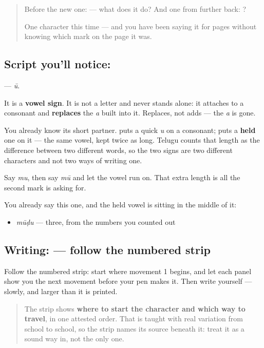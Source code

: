 \label{lesson:TE-S134-vowel-sign-uu}



\begin{quote}
Before the new one:  — what does it do? And one from further back: ?

One character this time — and you have been saying it for pages without knowing which mark on the page it was.
\end{quote}

\subsection*{Script you'll notice: }
\textbf{} — \emph{ū}.

It is a \textbf{vowel sign}. It is not a letter and never stands alone: it attaches to a consonant and \textbf{replaces} the \emph{a} built into it. Replaces, not adds — the \emph{a} is gone.

You already know its short partner. \textbf{} puts a quick \emph{u} on a consonant; \textbf{} puts a \textbf{held} one on it — the same vowel, kept twice as long. Telugu counts that length as the difference between two different words, so the two signs are two different characters and not two ways of writing one.

Say \emph{mu}, then say \emph{mū} and let the vowel run on. That extra length is all the second mark is asking for.

You already say this one, and the held vowel is sitting in the middle of it:

\begin{itemize}
\raggedright
  \item \textbf{} \emph{mūḍu} — three, from the numbers you counted out
\end{itemize}

\subsection*{Writing:  — follow the numbered strip}

Follow the numbered strip: start where movement 1 begins, and let each panel show you the next movement before your pen makes it. Then write  yourself — slowly, and larger than it is printed.

\begin{quote}
The strip shows \textbf{where to start the character and which way to travel}, in one attested order. That is taught with real variation from school to school, so the strip names its source beneath it: treat it as a sound way in, not the only one.
\end{quote}

